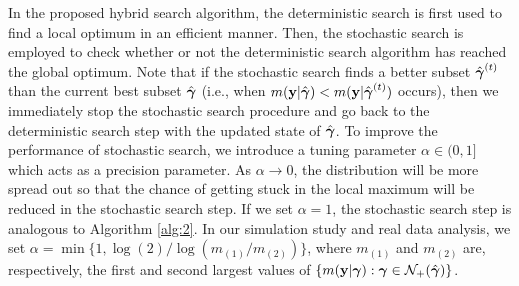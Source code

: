 In the proposed hybrid search algorithm, the deterministic search is first used to find a local optimum in an efficient manner. Then, the stochastic search is employed to check whether or not the deterministic search algorithm has reached the global optimum. Note that if the stochastic search finds a better subset $\hat{{\boldsymbol \gamma}}^{(t)}$ than the current best subset $\hat{{\boldsymbol \gamma}}$ (i.e., when $m({\bf y}|\hat{{\boldsymbol \gamma}})<m({\bf y}|\hat{{\boldsymbol \gamma}}^{(t)})$ occurs), then we immediately stop the stochastic search procedure and go back to the deterministic search step with the updated state of $\hat{{\boldsymbol \gamma}}$. To improve the performance of stochastic search, we introduce a tuning parameter $\alpha \in (0,1]$ which acts as a precision parameter. As $\alpha\to 0$, the distribution will be more spread out so that the chance of getting stuck in the local maximum will be reduced in the stochastic search step. If we set $\alpha=1$, the stochastic search step is analogous to Algorithm \ref{alg:2}. In our simulation study and real data analysis, we set $\alpha=\min\{1,\log(2)/\log( m_{(1)} /  m_{(2)} )\}$, where $m_{(1)}$ and $m_{(2)}$ are, respectively, the first and second largest values of $\{m({\bf y}|{\boldsymbol \gamma}):{\boldsymbol \gamma}  \in \mathcal{N}_+(\hat{{\boldsymbol \gamma}})\}$. 


